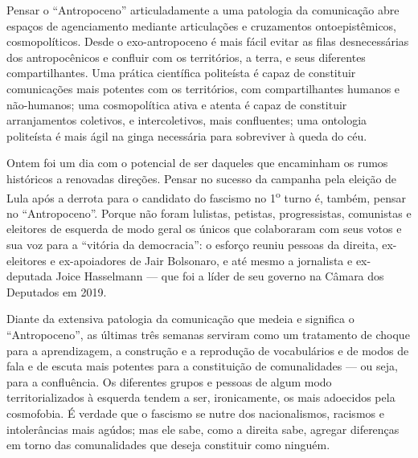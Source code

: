 Pensar o \enquote{Antropoceno} articuladamente a uma patologia da comunicação abre espaços de agenciamento mediante articulações e cruzamentos ontoepistêmicos, cosmopolíticos. Desde o exo-antropoceno é mais fácil evitar as filas desnecessárias dos antropocênicos e confluir com os territórios, a terra, e seus diferentes compartilhantes. Uma prática científica politeísta é capaz de constituir comunicações mais potentes com os territórios, com compartilhantes humanos e não-humanos; uma cosmopolítica ativa e atenta é capaz de constituir arranjamentos coletivos, e intercoletivos, mais confluentes; uma ontologia politeísta é mais ágil na ginga necessária para sobreviver à queda do céu.


Ontem foi um dia com o potencial de ser daqueles que encaminham os rumos históricos a renovadas direções. Pensar no sucesso da campanha pela eleição de Lula após a derrota para o candidato do fascismo no 1\textsuperscript{o} turno é, também, pensar no \enquote{Antropoceno}. Porque não foram lulistas, petistas, progressistas, comunistas e eleitores de esquerda de modo geral os únicos que colaboraram com seus votos e sua voz para a \enquote{vitória da democracia}: o esforço reuniu pessoas da direita, ex-eleitores e ex-apoiadores de Jair Bolsonaro, e até mesmo a jornalista e ex-deputada Joice Hasselmann --- que foi a líder de seu governo na Câmara dos Deputados em 2019.

Diante da extensiva patologia da comunicação que medeia e significa o \enquote{Antropoceno}, as últimas três semanas serviram como um tratamento de choque para a aprendizagem, a construção e a reprodução de vocabulários e de modos de fala e de escuta mais potentes para a constituição de comunalidades --- ou seja, para a confluência. Os diferentes grupos e pessoas de algum modo territorializados à esquerda tendem a ser, ironicamente, os mais adoecidos pela cosmofobia. É verdade que o fascismo se nutre dos nacionalismos, racismos e intolerâncias mais agúdos; mas ele sabe, como a direita sabe, agregar diferenças em torno das comunalidades que deseja constituir como ninguém.

